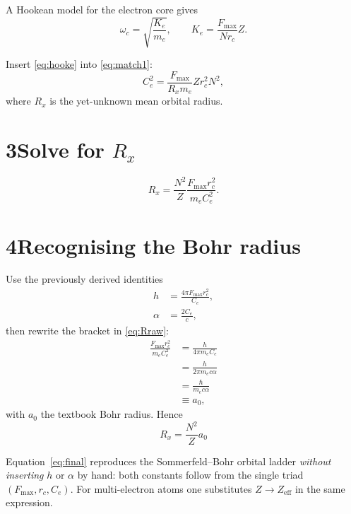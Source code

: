 \documentclass[11pt]{article}
\begin{document}
A Hookean model for the electron core gives
\begin{equation}
    \omega_c = \sqrt{\frac{K_e}{m_e}}, \qquad
    K_e = \frac{F_{\max}}{N r_c} Z.
\label{eq:hooke}
\end{equation}

Insert \eqref{eq:hooke} into \eqref{eq:match1}:
\begin{equation}
    C_e^2 = \frac{F_{\max}}{R_x m_e} Z r_c^{2} N^{2},
\label{eq:master}
\end{equation}
where $R_x$ is the yet-unknown mean orbital radius.

\section*{3\quad Solve for $R_x$}

\begin{equation}
    R_x = \frac{N^{2}}{Z} \frac{F_{\max} r_c^{2}}{m_e C_e^{2}}.
\label{eq:Rraw}
\end{equation}

\section*{4\quad Recognising the Bohr radius}

Use the previously derived identities
\begin{align}
    h &= \frac{4\pi F_{\max} r_c^{2}}{C_e}, \tag{A} \\
\alpha &= \frac{2C_e}{c},\tag{B}
\end{align}
then rewrite the bracket in \eqref{eq:Rraw}:
\begin{align*}
\frac{F_{\max}r_c^{2}}{m_eC_e^{2}}
    &= \frac{h}{4\pi m_e C_e} \\
    &= \frac{h}{2\pi m_e c \alpha} \\
    &= \frac{\hbar}{m_e c \alpha} \\
    &\equiv a_0,
\end{align*}
with $a_0$ the textbook Bohr radius.  Hence
\begin{equation}
    \boxed{R_x = \frac{N^{2}}{Z} a_0}
\label{eq:final}
\end{equation}

Equation~\eqref{eq:final} reproduces the Sommerfeld--Bohr orbital ladder \textit{without inserting} $h$ or $\alpha$ by hand: both constants follow from the single triad $(F_{\max}, r_c, C_e)$. For multi-electron atoms one substitutes $Z \rightarrow Z_{\text{eff}}$ in the same expression.
\end{document}
